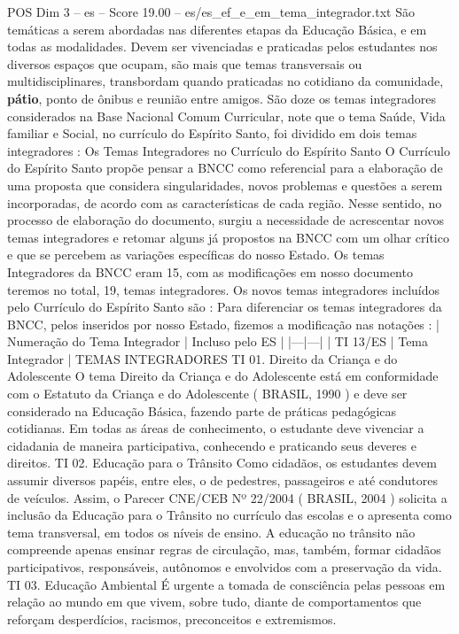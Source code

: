 \begin{textsample}{POS Dim 3 – es – Score 19.00 – es/es\_ef\_e\_em\_tema\_integrador.txt}
São temáticas a serem abordadas nas diferentes etapas da Educação Básica, e em todas as modalidades.
Devem ser vivenciadas e praticadas pelos estudantes nos diversos espaços que ocupam, são mais que temas transversais ou multidisciplinares, transbordam quando praticadas no cotidiano da comunidade, \textbf{pátio}, ponto de ônibus e reunião entre amigos.
São doze os temas integradores considerados na Base Nacional Comum Curricular, note que o tema Saúde, Vida familiar e Social, no currículo do Espírito Santo, foi dividido em dois temas integradores : Os Temas Integradores no Currículo do Espírito Santo O Currículo do Espírito Santo propõe pensar a BNCC como referencial para a elaboração de uma proposta que considera singularidades, novos problemas e questões a serem incorporadas, de acordo com as características de cada região.
Nesse sentido, no processo de elaboração do documento, surgiu a necessidade de acrescentar novos temas integradores e retomar alguns já propostos na BNCC com um olhar crítico e que se percebem as variações específicas do nosso Estado.
Os temas Integradores da BNCC eram 15, com as modificações em nosso documento teremos no total, 19, temas integradores.
Os novos temas integradores incluídos pelo Currículo do Espírito Santo são : Para diferenciar os temas integradores da BNCC, pelos inseridos por nosso Estado, fizemos a modificação nas notações : | Numeração do Tema Integrador | Incluso pelo ES | |---|---| | TI 13/ES | Tema Integrador | TEMAS INTEGRADORES TI 01.
Direito da Criança e do Adolescente O tema Direito da Criança e do Adolescente está em conformidade com o Estatuto da Criança e do Adolescente ( BRASIL, 1990 ) e deve ser considerado na Educação Básica, fazendo parte de práticas pedagógicas cotidianas.
Em todas as áreas de conhecimento, o estudante deve vivenciar a cidadania de maneira participativa, conhecendo e praticando seus deveres e direitos.
TI 02.
Educação para o Trânsito Como cidadãos, os estudantes devem assumir diversos papéis, entre eles, o de pedestres, passageiros e até condutores de veículos.
Assim, o Parecer CNE/CEB Nº 22/2004 ( BRASIL, 2004 ) solicita a inclusão da Educação para o Trânsito no currículo das escolas e o apresenta como tema transversal, em todos os níveis de ensino.
A educação no trânsito não compreende apenas ensinar regras de circulação, mas, também, formar cidadãos participativos, responsáveis, autônomos e envolvidos com a preservação da vida.
TI 03.
Educação Ambiental É urgente a tomada de consciência pelas pessoas em relação ao mundo em que vivem, sobre tudo, diante de comportamentos que reforçam desperdícios, racismos, preconceitos e extremismos.

\end{textsample}
